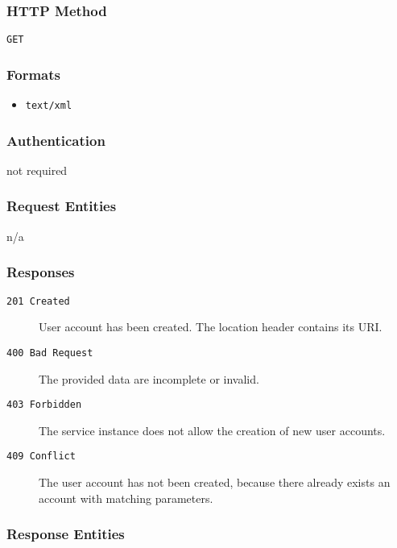 \documentclass[a4paper,9pt]{extarticle}
\begin{document}
		\subsubsection*{HTTP Method}
		\texttt{GET}
		\subsubsection*{Formats}
		
	\begin{itemize}
		
		\item \texttt{text/xml}
	
	\end{itemize}
	
		\subsubsection*{Authentication}
		not required
		\subsubsection*{Request Entities}
		n/a
		\subsubsection*{Responses}
		
		\begin{description}
		
			\item[\texttt{201 Created}] User account has been created. The location header contains its URI.
			\item[\texttt{400 Bad Request}] The provided data are incomplete or invalid.
			\item[\texttt{403 Forbidden}] The service instance does not allow the creation of new user accounts.
			\item[\texttt{409 Conflict}] The user account has not been created, because there already exists an account with matching parameters.
		\end{description}
	
		\subsubsection*{Response Entities}
		
\end{document}
